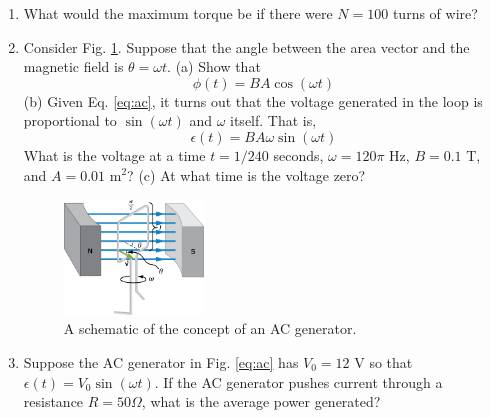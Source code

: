 \documentclass[10pt]{article}
\begin{document}
\begin{enumerate}
\item What would the maximum torque be if there were $N = 100$ turns of wire? \\ \vspace{1cm}
\item Consider Fig. \ref{fig:acgen}.  Suppose that the angle between the area vector and the magnetic field is $\theta = \omega t$.  (a) Show that
\begin{equation}
\phi(t) = BA\cos(\omega t) \label{eq:ac}
\end{equation}
(b) Given Eq. \ref{eq:ac}, it turns out that the voltage generated in the loop is proportional to $\sin(\omega t)$ and $\omega$ itself.  That is,
\begin{equation}
\epsilon(t) = BA\omega \sin(\omega t)
\end{equation}
What is the voltage at a time $t = 1/240$ seconds, $\omega = 120\pi$ Hz, $B = 0.1$ T, and $A = 0.01$ m$^2$? (c) At what time is the voltage zero? \\ \vspace{3cm}
\begin{figure}[hb]
\centering
\includegraphics[width=0.35\textwidth]{acGen.jpeg}
\caption{\label{fig:acgen} A schematic of the concept of an AC generator.}
\end{figure}
\item Suppose the AC generator in Fig. \ref{eq:ac} has $V_0 = 12$ V so that $\epsilon(t) = V_0 \sin(\omega t)$.  If the AC generator pushes current through a resistance $R = 50\Omega$, what is the average power generated?
\end{enumerate}
\end{document}

